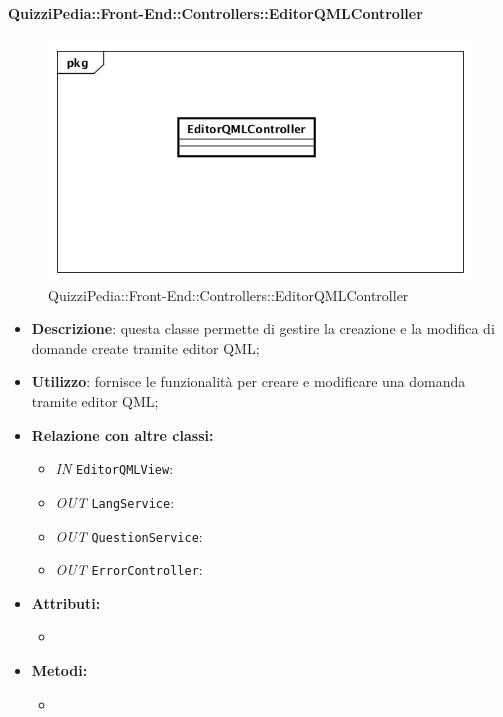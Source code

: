 \paragraph{QuizziPedia::Front-End::Controllers::EditorQMLController}
\begin{figure}
	\centering
	\includegraphics[scale=0.45]{UML/Classi/Front-End/QuizziPedia_Front-end_Controller_EditorQMLController.png}
	\caption{QuizziPedia::Front-End::Controllers::EditorQMLController}
\end{figure}
\begin{itemize}
	\item \textbf{Descrizione}: questa classe permette di gestire la creazione e la modifica di domande create tramite editor QML;
	\item \textbf{Utilizzo}: fornisce le funzionalità per creare e modificare una domanda tramite editor QML;
	\item \textbf{Relazione con altre classi:}
	\begin{itemize}
		\item \textit{IN} \texttt{EditorQMLView}:  
		\item \textit{OUT} \texttt{LangService}: 
		\item \textit{OUT} \texttt{QuestionService}: 
		\item \textit{OUT} \texttt{ErrorController}: 
	\end{itemize}
	\item \textbf{Attributi:}
	\begin{itemize}
		\item 
	\end{itemize}
	\item \textbf{Metodi:}
	\begin{itemize}
		\item 
	\end{itemize}
\end{itemize}

